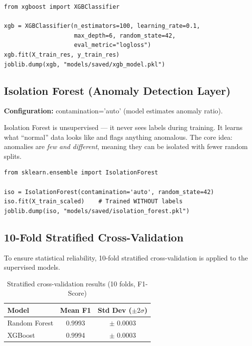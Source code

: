 \documentclass[12pt,a4paper]{report}
\begin{document}
\begin{lstlisting}[caption={XGBoost training}]
from xgboost import XGBClassifier

xgb = XGBClassifier(n_estimators=100, learning_rate=0.1,
                    max_depth=6, random_state=42,
                    eval_metric="logloss")
xgb.fit(X_train_res, y_train_res)
joblib.dump(xgb, "models/saved/xgb_model.pkl")
\end{lstlisting}

\subsection{Isolation Forest (Anomaly Detection Layer)}

\textbf{Configuration:} contamination='auto' (model estimates anomaly ratio).

Isolation Forest is unsupervised --- it never sees labels during training. It learns what ``normal'' data looks like and flags anything anomalous. The core idea: anomalies are \textit{few and different}, meaning they can be isolated with fewer random splits.

\begin{lstlisting}[caption={Isolation Forest training}]
from sklearn.ensemble import IsolationForest

iso = IsolationForest(contamination='auto', random_state=42)
iso.fit(X_train_scaled)    # Trained WITHOUT labels
joblib.dump(iso, "models/saved/isolation_forest.pkl")
\end{lstlisting}

\subsection{10-Fold Stratified Cross-Validation}

To ensure statistical reliability, 10-fold stratified cross-validation is applied to the supervised models.

\begin{table}[H]
\centering
\caption{Stratified cross-validation results (10 folds, F1-Score)}
\label{tab:cv_results}
\begin{tabular}{lcc}
\toprule
\textbf{Model} & \textbf{Mean F1} & \textbf{Std Dev ($\pm 2\sigma$)} \\
\midrule
Random Forest & 0.9993 & $\pm$ 0.0003 \\
XGBoost & 0.9994 & $\pm$ 0.0003 \\
\bottomrule
\end{tabular}
\end{table}
\end{document}
